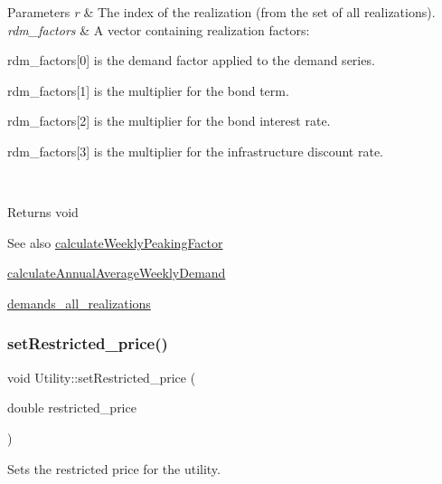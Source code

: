 \begin{DoxyParams}{Parameters}
{\em r} & The index of the realization (from the set of all realizations). \\
\hline
{\em rdm\+\_\+factors} & A vector containing realization factors\+:
\begin{DoxyItemize}
\item rdm\+\_\+factors\mbox{[}0\mbox{]} is the demand factor applied to the demand series.
\item rdm\+\_\+factors\mbox{[}1\mbox{]} is the multiplier for the bond term.
\item rdm\+\_\+factors\mbox{[}2\mbox{]} is the multiplier for the bond interest rate.
\item rdm\+\_\+factors\mbox{[}3\mbox{]} is the multiplier for the infrastructure discount rate.
\end{DoxyItemize}\\
\hline
\end{DoxyParams}
\begin{DoxyReturn}{Returns}
void
\end{DoxyReturn}
\begin{DoxySeeAlso}{See also}
\mbox{\hyperlink{classUtility_a54c8621f2cce5257343f8dc6bfd76cff}{calculate\+Weekly\+Peaking\+Factor}} 

\mbox{\hyperlink{classUtility_a5bae4fe8c3f0c782f0cdf5d14b7b92a7}{calculate\+Annual\+Average\+Weekly\+Demand}} 

\mbox{\hyperlink{classUtility_a8ffed6cb590d6f0855128828c3f289b8}{demands\+\_\+all\+\_\+realizations}} 
\end{DoxySeeAlso}
\mbox{\label{classUtility_a7f642d886a6d1d165e86b2e6a7c51ed4}} 
\subsubsection{\texorpdfstring{set\+Restricted\+\_\+price()}{setRestricted\_price()}}
{\footnotesize\ttfamily void Utility\+::set\+Restricted\+\_\+price (\begin{DoxyParamCaption}\item[{double}]{restricted\+\_\+price }\end{DoxyParamCaption})}



Sets the restricted price for the utility. 

